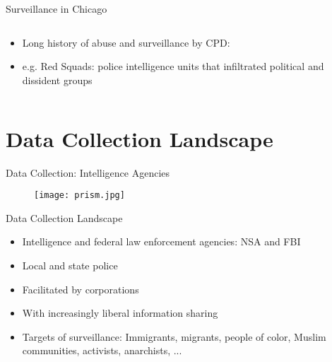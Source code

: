 \documentclass[newPxFont]{beamer}
\begin{document}
\begin{frame}{Surveillance in Chicago}
\begin{columns}
\begin{column}{0.45\textwidth}
\begin{itemize}
\item Long history of abuse and surveillance by CPD:
\item e.g. Red Squads: police intelligence units that infiltrated political and dissident groups
\end{itemize}
\end{column}
\end{columns}
\end{frame}

%
%

\section{Data Collection Landscape}

\begin{frame}{Data Collection: Intelligence Agencies}
\begin{figure} 
\centering 
\texttt{[image: prism.jpg]} 
\end{figure}
\end{frame}

\begin{frame}{Data Collection Landscape}
        \begin{itemize}
            \item<1-> Intelligence and federal law enforcement agencies: NSA and FBI
            \item<2-> Local and state police
            \item<3-> Facilitated by corporations
            \item<4-> With increasingly liberal information sharing
            \item<5-> Targets of surveillance: Immigrants, migrants, people of color, Muslim communities, activists, anarchists, ...
        \end{itemize}
\end{frame}
\end{document}
